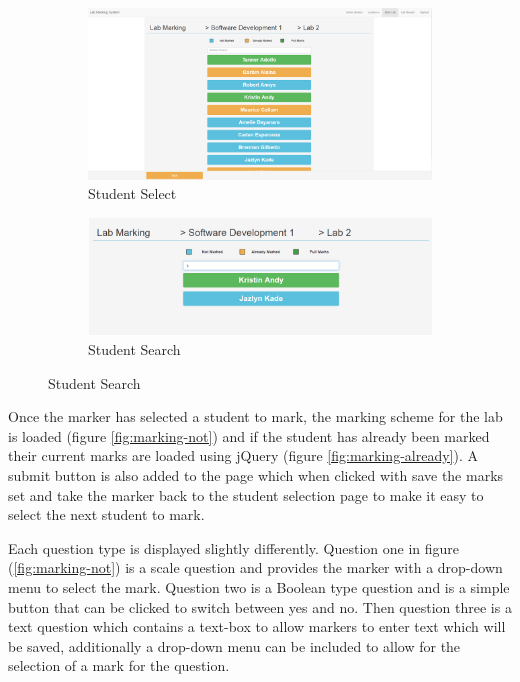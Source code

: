\documentclass[11pt]{report}
\begin{document}
\begin{figure}[H]
\caption{Selecting Student Page}
\centering
\begin{subfigure}[c]{0.45\textwidth}
    \includegraphics[width=1\textwidth]{images/implementation/marking-3-page.png}
    \caption{Student Select}
    \label{fig:marking-student}
\end{subfigure}
\hfill
\begin{subfigure}[c]{0.45\textwidth}
    \includegraphics[width=1\textwidth]{images/implementation/marking-4-page.png}
    \caption{Student Search}
    \label{fig:marking-search}
\end{subfigure}

\end{figure}

\noindent Once the marker has selected a student to mark, the marking scheme for the lab is loaded (figure \ref{fig:marking-not}) and if the student has already been marked their current marks are loaded using jQuery (figure \ref{fig:marking-already}). A submit button is also added to the page which when clicked with save the marks set and take the marker back to the student selection page to make it easy to select the next student to mark.

Each question type is displayed slightly differently. Question one in figure (\ref{fig:marking-not}) is a scale question and provides the marker with a drop-down menu to select the mark. Question two is a Boolean type question and is a simple button that can be clicked to switch between yes and no. Then question three is a text question which contains a text-box to allow markers to enter text which will be saved, additionally a drop-down menu can be included to allow for the selection of a mark for the question. 
\end{document}
